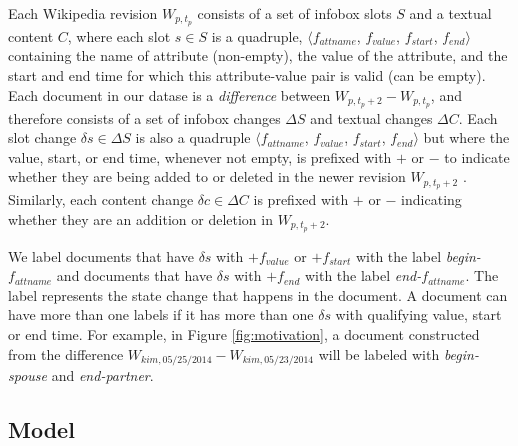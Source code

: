 Each Wikipedia revision $W_{p, t_p}$ consists of a set of infobox slots $S$ and a textual content $C$, where each slot $s \in S$ is a quadruple, $\langle f_{attname}$, $f_{value}$,  $f_{start}$, $f_{end} \rangle$ containing the name of attribute (non-empty), the value of the attribute, and the start and end time for which this attribute-value pair is valid (can be empty). Each document in our datase is a \textit{difference} between $W_{p, t_p+2} - W_{p, t_p}$, and therefore consists of a set of infobox changes $\Delta S$ and textual changes $\Delta C$. Each slot change $\delta s \in \Delta S$ is also a quadruple $\langle f_{attname}$, $f_{value}$,  $f_{start}$, $f_{end} \rangle$ but where the value, start, or end time, whenever not empty, is prefixed with $+$ or $-$ to indicate whether they are being added to or deleted in the newer revision $W_{p, t_p+2}$ . Similarly, each content change $\delta c \in \Delta C$ is prefixed with $+$ or $-$ indicating whether they are an addition or deletion in $W_{p, t_p+2}$. 

We label documents that have  $\delta s$ with $+f_{value}$ or $+f_{start}$ with the label \textit{begin-}$f_{attname}$ and documents that have $\delta s$ with $+f_{end}$ with the label \textit{end-}$f_{attname}$. The label represents the state change that happens in the document. A document can have more than one labels if it has more than one $\delta s$ with qualifying value, start or end time. For example, in Figure \ref{fig:motivation}, a document constructed from the difference $W_{kim, 05/25/2014} - W_{kim, 05/23/2014}$ will be labeled with \textit{begin-spouse} and \textit{end-partner}. 


\subsection{Model}

